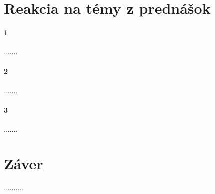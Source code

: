 \documentclass[10pt,twoside,slovak,a4paper]{article}
\begin{document}
\section{Reakcia na témy z prednášok}
\paragraph{1}

.......
\paragraph{2}


.......
\paragraph{3}

.......



\section{Záver} \label{zaver} %
..........





\end{document}
